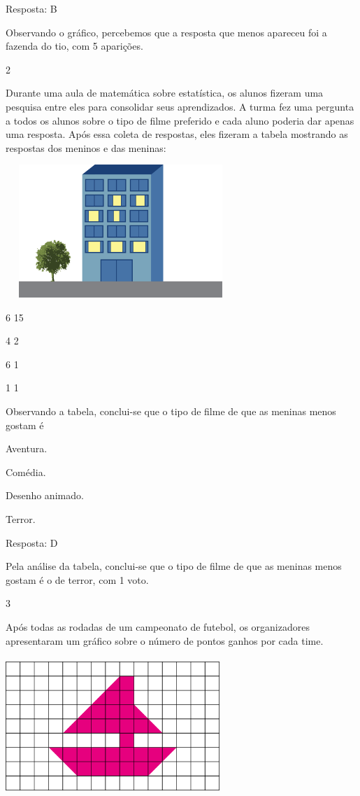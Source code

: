\begin{multicols}{2}
{\begin{escolha}
{Resposta: B

Observando o gráfico, percebemos que a resposta que menos apareceu foi a
fazenda do tio, com 5 aparições.

\num{2}

Durante uma aula de matemática sobre estatística, os alunos fizeram uma
pesquisa entre eles para consolidar seus aprendizados. A turma fez uma
pergunta a todos os alunos sobre o tipo de filme preferido e cada aluno
poderia dar apenas uma resposta. Após essa coleta de respostas, eles
fizeram a tabela mostrando as respostas dos meninos e das
meninas:

\includegraphics[width=3.42308in,height=1.97646in]{media/image93.png}


6 15

4 2

6 1

1 1

Observando a tabela, conclui-se que o tipo de filme de que as meninas menos
gostam é

\begin{escolha}

\item
  Aventura.
\item
  Comédia.
\item
  Desenho animado.
\item
  Terror.
\end{escolha}

Resposta: D

Pela análise da tabela, conclui-se que o tipo de filme de que as meninas menos gostam é o de terror, com 1 voto.

\num{3}

Após todas as rodadas de um campeonato de futebol, os organizadores
apresentaram um gráfico sobre o número de pontos ganhos por cada
time.

\includegraphics[width=3.19194in,height=2.04184in]{media/image94.png}

}
\end{escolha}}
\end{multicols}
